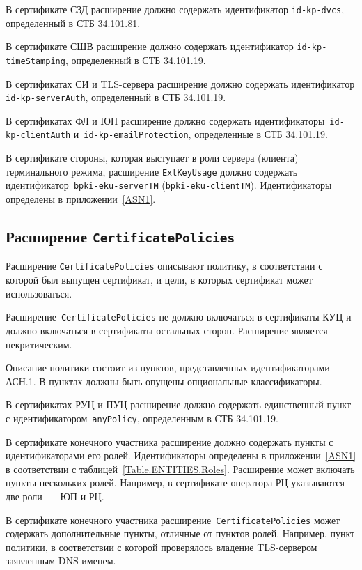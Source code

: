 В сертификате СЗД расширение должно содержать
идентификатор \verb|id-kp-dvcs|, определенный в СТБ 34.101.81.

В сертификате СШВ расширение должно содержать
идентификатор \verb|id-kp-timeStamping|, определенный в СТБ 34.101.19.

В сертификатах СИ и TLS-сервера расширение должно содержать
идентификатор \verb|id-kp-serverAuth|, определенный в СТБ 34.101.19.

В сертификатах ФЛ и ЮП расширение должно содержать
идентификаторы~\verb|id-kp-clientAuth| и~\verb|id-kp-emailProtection|, 
определенные в СТБ 34.101.19.

В сертификате стороны, которая выступает в роли сервера (клиента)
терминального режима, расширение \texttt{ExtKeyUsage} должно содержать
идентификатор~\texttt{bpki-eku-serverTM} (\texttt{bpki-eku-clientTM}). 
Идентификаторы определены в приложении~\ref{ASN1}.

\subsection{Расширение \texttt{CertificatePolicies}}\label{FMT.Ext.CP}

Расширение \texttt{CertificatePolicies} описывают политику, в соответствии 
с которой был выпущен сертификат, и цели, в которых сертификат может 
использоваться. 

Расширение~\texttt{CertificatePolicies} не должно включаться в сертификаты
КУЦ и должно включаться в сертификаты остальных сторон. 
Расширение является некритическим.

Описание политики состоит из пунктов, представленных идентификаторами 
АСН.1. В пунктах должны быть опущены опциональные классификаторы. 

В сертификатах РУЦ и ПУЦ расширение должно содержать единственный пункт
с идентификатором~\texttt{anyPolicy}, определенным в СТБ 34.101.19.

В сертификате конечного участника расширение 
должно содержать пункты с идентификаторами его ролей.
Идентификаторы определены в приложении~\ref{ASN1}
в соответствии с таблицей~\ref{Table.ENTITIES.Roles}. 
Расширение может включать пункты нескольких ролей.
Например, в сертификате оператора РЦ указываются две роли~--- ЮП и РЦ.

В сертификате конечного участника расширение~\texttt{CertificatePolicies} 
может содержать дополнительные пункты, отличные от пунктов 
ролей. Например, пункт политики, в соответствии с которой 
проверялось владение TLS-сервером заявленным DNS-именем.

